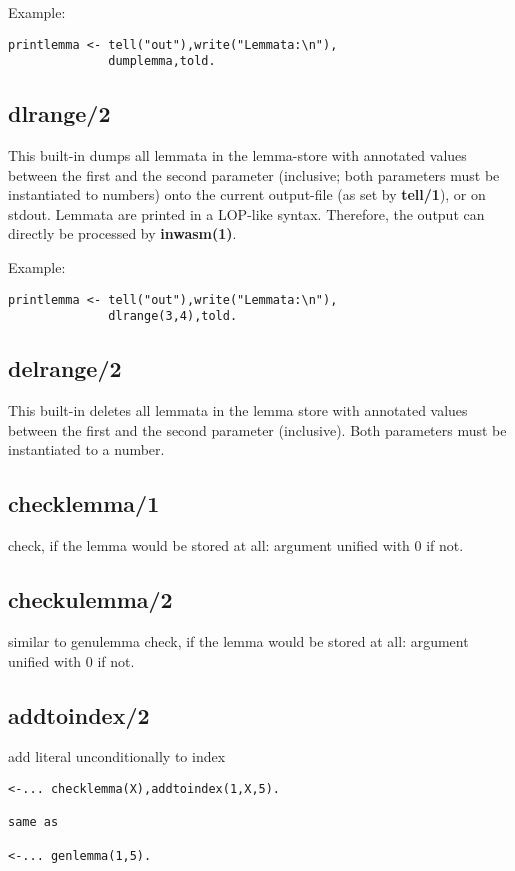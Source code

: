 Example:
\begin{verbatim}
printlemma <- tell("out"),write("Lemmata:\n"),
              dumplemma,told.
\end{verbatim}

\subsection{dlrange/2}

This built-in dumps all lemmata in the lemma-store
with annotated values between the first and the second parameter
(inclusive; both parameters must be instantiated to numbers)
onto the current output-file (as set by {\bf tell/1}), or on
stdout.
Lemmata are printed in a LOP-like syntax. Therefore, the output can directly
be processed by {\bf inwasm(1)}.

Example:
\begin{verbatim}
printlemma <- tell("out"),write("Lemmata:\n"),
              dlrange(3,4),told.
\end{verbatim}

\subsection{delrange/2}
This built-in deletes all lemmata in the lemma store
with annotated values between the first and the second parameter
(inclusive).
Both parameters must be instantiated to a number.

\subsection{checklemma/1}
check, if the lemma would be stored at all:
argument unified with 0 if not.
\subsection{checkulemma/2}
similar to genulemma
check, if the lemma would be stored at all:
argument unified with 0 if not.

\subsection{addtoindex/2}
add literal unconditionally to index

\begin{verbatim}
<-... checklemma(X),addtoindex(1,X,5).

same as 

<-... genlemma(1,5).
\end{verbatim}


